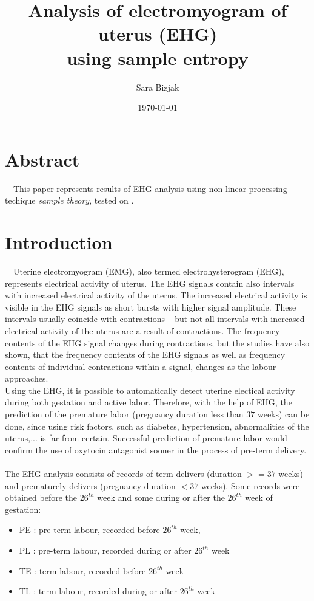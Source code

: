 \documentclass[a4paper,11pt]{article}
\title{Analysis of electromyogram of uterus (EHG) \\
using sample entropy}
\author{Sara Bizjak}
\date{\today}
\begin{document}
\maketitle

\section{Abstract}

\ \ 
This paper represents results of EHG analysis using non-linear processing techique \textit{sample theory}, tested on \cite{bib:fisio}. 
\section{Introduction}

\ \
Uterine electromyogram (EMG), also termed electrohysterogram (EHG), represents electrical activity of uterus.
The EHG signals contain also intervals with increased electrical activity of the uterus. 
The increased electrical activity is visible in the EHG signals as short bursts with higher signal amplitude. 
These intervals usually coincide with contractions -- but not all intervals with increased electrical activity of the uterus are a result of contractions. 
The frequency contents of the EHG signal changes during contractions, 
but the studies have also shown, that the frequency contents of the EHG signals as well as frequency contents of individual contractions within a signal, changes as the labour approaches.
\\
Using the EHG, it is possible to automatically detect uterine electical activity during both gestation and active labor. Therefore, with the help of EHG, the prediction of the premature labor (pregnancy duration less than $37$ weeks) can be done, 
since using risk factors, such as diabetes, hypertension, abnormalities of the uterus,... is far from certain.
Successful prediction of premature labor would confirm the use of oxytocin antagonist sooner in the process of pre-term delivery. 
\\
\\
The EHG analysis consists of records of term delivers (duration $>= 37$ weeks) and prematurely delivers (pregnancy duration $< 37$ weeks). 
Some records were obtained before the $26^{th}$ week and some during or after the $26^{th}$ week of gestation:
\begin{itemize}
    \item PE : pre-term labour, recorded before $26^{th}$ week,
    \item PL : pre-term labour, recorded during or after $26^{th}$ week
    \item TE : term labour, recorded before $26^{th}$ week
    \item TL : term labour, recorded during or after $26^{th}$ week
\end{itemize}
\end{document}
